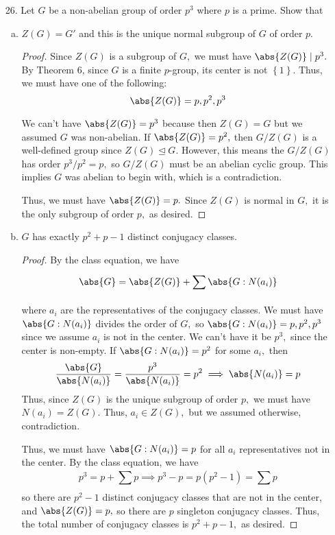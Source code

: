 \documentclass{article}
\begin{document}
\begin{itemize}
\begin{proof}
			\end{proof}

	\item[26.] Let $G$ be a non-abelian group of order $p^3$ where $p$ is a prime. Show that
		\begin{enumerate}[(a)]
			\item $Z(G)=G'$ and this is the unique normal subgroup of $G$ of order $p.$
				\begin{proof}
					Since $Z(G)$ is a subgroup of $G,$ we must have $\abs{Z(G)}\mid p^3.$ By Theorem 6, since $G$ is a finite $p$-group, its center is not $\left\{ 1 \right\}.$ Thus, we must have one of the following: \[\abs{Z(G)} = p, p^2, p^3\] 
					
					We can't have $\abs{Z(G)}=p^3$ because then $Z(G)=G$ but we assumed $G$ was non-abelian. If $\abs{Z(G)}=p^2,$ then $G/Z(G)$ is a well-defined group since $Z(G)\unlhd G.$ However, this means the $G/Z(G)$ has order $p^3/p^2=p,$ so $G/Z(G)$ must be an abelian cyclic group. This implies $G$ was abelian to begin with, which is a contradiction. 

					Thus, we must have $\abs{Z(G)}=p.$ Since $Z(G)$ is normal in $G,$ it is the only subgroup of order $p,$ as desired.
					
				\end{proof}

			\item $G$ has exactly $p^2+p-1$ distinct conjugacy classes.
				\begin{proof}
					By the class equation, we have \[\abs{G} = \abs{Z(G)}+\sum_{}^{}\abs{G:N(a_i)}\] where $a_i$ are the representatives of the conjugacy classes. We must have $\abs{G:N(a_i)}$ divides the order of $G,$ so $\abs{G:N(a_i)}=p, p^2, p^3$ since we assume $a_i$ is not in the center. We can't have it be $p^3,$ since the center is non-empty. If $\abs{G:N(a_i)}=p^2$ for some $a_i,$ then \[\frac{\abs{G}}{\abs{N(a_i)}} = \frac{p^3}{\abs{N(a_i)}} = p^2 \implies \abs{N(a_i)}=p\] Thus, since $Z(G)$ is the unique subgroup of order $p,$ we must have $N(a_i)=Z(G).$ Thus, $a_i\in Z(G),$ but we assumed otherwise, contradiction.

					Thus, we must have $\abs{G:N(a_i)}=p$ for all $a_i$ representatives not in the center. By the class equation, we have \[p^3=p+\sum_{}^{}p\implies p^3-p=p(p^2-1)=\sum_{}^{}p\] so there are $p^2-1$ distinct conjugacy classes that are not in the center, and $\abs{Z(G)}=p,$ so there are $p$ singleton conjugacy classes. Thus, the total number of conjugacy classes is $p^2+p-1,$ as desired.
					
				\end{proof}
				
		\end{enumerate}
		
\end{itemize}
\end{document}
